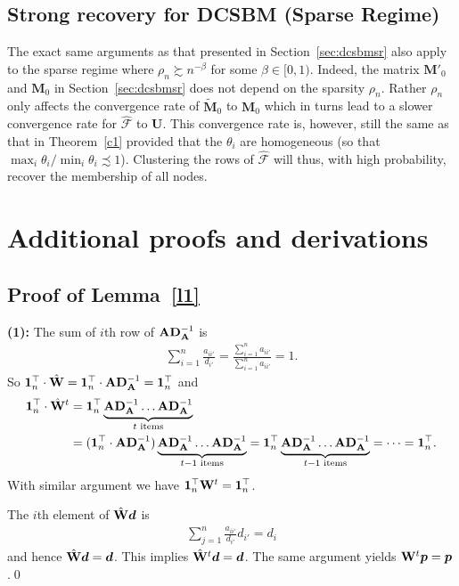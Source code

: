 \documentclass[10pt,journal,compsoc]{IEEEtran}
\newcommand{\ee}{\end{aligned} \end{equation}}
\newcommand{\bds}{\boldsymbol}
\newcommand{\tp}{^\top}
\newcommand{\bee}{\begin{equation}\begin{aligned}}
\newcommand{\M}[1]{{{\mathbf{\MakeUppercase{#1}}}}}
\numberwithin{equation}{section}
\begin{document}
\subsection{Strong recovery for DCSBM (Sparse Regime)}\label{sec:sparsedcebm}
The exact same arguments as that presented in Section~\ref{sec:dcsbmsr} also apply to the sparse regime where $\rho_n \succsim n^{-\beta}$ for some $\beta \in [0,1)$. Indeed, the matrix $\mathbf{M}'_0$ and $\mathbf{M}_0$ in Section~\ref{sec:dcsbmsr} does not depend on the sparsity $\rho_n$. Rather $\rho_n$ only affects the convergence rate of $\tilde{\mathbf{M}}_0$ to $\mathbf{M}_0$ which in turns lead to a slower convergence rate for $\hat{\bds{\mathcal{F}}}$ to $\mathbf{U}$. This convergence rate is, however, still the same as that in Theorem~\ref{c1} provided that the $\theta_i$ are homogeneous (so that $\max_{i} \theta_i / \min_{i} \theta_i \precsim 1$). Clustering the rows of $\hat{\bds{\mathcal{F}}}$ will thus, with high probability, recover the membership of all nodes. 

\section{Additional proofs and derivations}
\label{app:lemma}
\subsection{Proof of Lemma~\ref{l1}}
\textbf{(1):} The sum of $i$th row of $\M A \M D_{\M A}^{-1}$ is 
\bee\nonumber
\sum_{i=1}^{n} \frac{a_{ii'}}{d_{i'}} = \frac{\sum_{i=1}^{n}a_{ii'}}{\sum_{i=1}^{n}a_{ii'}} = 1.
\ee So $\M 1_n\tp \cdot \hat{\M W}  =\M 1_n\tp \cdot \M A \M D_{\M A}^{-1}  = \M 1_n\tp$ and
\bee\nonumber
\M 1_n\tp \cdot \hat{\M W}^{t} &= \M1_n \tp \underbrace{\M A \M D_{\M A}^{-1} \dots \M A \M D_{\M A}^{-1}}_{t\text{ items}} 
\\ &= (\M1_n\tp \cdot \M A \M D_{\M A}^{-1})\underbrace{\M A \M D_{\M A}^{-1} \dots \M A \M D_{\M A}^{-1}}_{t-1\text{ items}}
= \M1_n\tp\underbrace{\M A \M D_{\M A}^{-1} \dots \M A \M D_{\M A}^{-1}}_{t-1\text{ items}} 
= \cdots 
= \M 1_n\tp.
\ee
With similar argument we have $\M 1_n\tp\M W^t  = \M 1_n\tp$.

 The $i$th element of $\hat{\M W}\bds{d}$ is 
\bee\nonumber
\sum_{j = 1}^n\frac{a_{ii'}}{d_{i'}}d_{i'} = d_i
\ee
and hence $\hat{\M W}\bds{d} = \bds{d}$. This implies
$\hat{\M W}^t \bds{d} = \bds{d}$. The same argument yields $\M W^t \bds{p} = \bds{p}$.\qed
\end{document}
